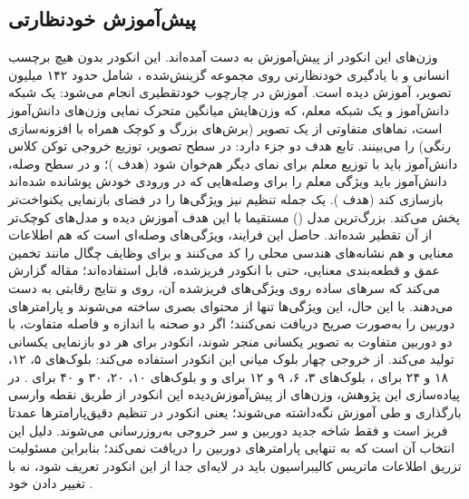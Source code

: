 \subsection[پیش‌آموزش خودنظارتی \lr{DINOv2}]{پیش‌آموزش خودنظارتی {}}
وزن‌های این انکودر از پیش‌آموزش  به دست آمده‌اند. این انکودر بدون هیچ برچسب انسانی و با یادگیری خودنظارتی روی مجموعه گزینش‌شده ، شامل حدود ۱۴۲ میلیون تصویر، آموزش دیده است. آموزش در چارچوب خودتقطیری انجام می‌شود: یک شبکه دانش‌آموز و یک شبکه معلم، که وزن‌هایش میانگین متحرک نمایی وزن‌های دانش‌آموز است، نماهای متفاوتی از یک تصویر (برش‌های بزرگ و کوچک همراه با افزونه‌سازی رنگی) را می‌بینند. تابع هدف دو جزء دارد: در سطح تصویر، توزیع خروجی توکن کلاس دانش‌آموز باید با توزیع معلم برای نمای دیگر هم‌خوان شود (هدف )؛ و در سطح وصله، دانش‌آموز باید ویژگی معلم را برای وصله‌هایی که در ورودی خودش پوشانده شده‌اند بازسازی کند (هدف ). یک جمله تنظیم  نیز ویژگی‌ها را در فضای بازنمایی یکنواخت‌تر پخش می‌کند. بزرگ‌ترین مدل () مستقیما با این هدف آموزش دیده و مدل‌های کوچک‌تر از آن تقطیر شده‌اند. حاصل این فرایند، ویژگی‌های وصله‌ای است که هم اطلاعات معنایی و هم نشانه‌های هندسی محلی را کد می‌کنند و برای وظایف چگال مانند تخمین عمق و قطعه‌بندی معنایی، حتی با انکودر فریزشده، قابل استفاده‌اند؛ مقاله  گزارش می‌کند که سرهای ساده روی ویژگی‌های فریزشده آن، روی  و  نتایج رقابتی به دست می‌دهند. با این حال، این ویژگی‌ها تنها از محتوای بصری ساخته می‌شوند و پارامترهای دوربین را به‌صورت صریح دریافت نمی‌کنند؛ اگر دو صحنه با اندازه و فاصله متفاوت، با دو دوربین متفاوت به تصویر یکسانی منجر شوند، انکودر برای هر دو بازنمایی یکسانی تولید می‌کند.  از خروجی چهار بلوک میانی این انکودر استفاده می‌کند: بلوک‌های ۵، ۱۲، ۱۸ و ۲۴ برای ، بلوک‌های ۳، ۶، ۹ و ۱۲ برای  و  و بلوک‌های ۱۰، ۲۰، ۳۰ و ۴۰ برای . در پیاده‌سازی این پژوهش، وزن‌های از پیش‌آموزش‌دیده این انکودر از طریق نقطه وارسی  بارگذاری و طی آموزش نگه‌داشته می‌شوند؛ یعنی انکودر  در تنظیم دقیق‌پارامترها عمدتا فریز است و فقط شاخه جدید دوربین و سر خروجی به‌روزرسانی می‌شوند. دلیل این انتخاب آن است که  به تنهایی پارامترهای دوربین را دریافت نمی‌کند؛ بنابراین مسئولیت تزریق اطلاعات ماتریس کالیبراسیون باید در لایه‌ای جدا از این انکودر تعریف شود، نه با تغییر دادن خود .

